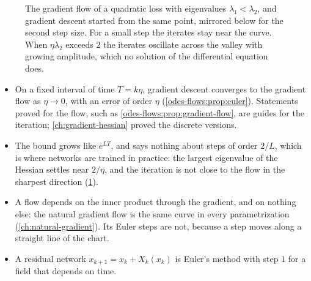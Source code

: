 \begin{notechapter}
\begin{figure}[ht]
\centering
{}
\caption{The gradient flow of a quadratic loss with eigenvalues
$\lambda_1 < \lambda_2$, and gradient descent started from the same
point, mirrored below for the second step size. For a small step the
iterates stay near the curve. When $\eta\lambda_2$ exceeds $2$ the
iterates oscillate across the valley with growing amplitude, which no
solution of the differential equation does.}
\label{odes-flows:fig:euler}
\end{figure}

\begin{mlthread}
\begin{itemize}[nosep]
  \item On a fixed interval of time $T = k\eta$, gradient descent
        converges to the gradient flow as $\eta\to0$, with an error of
        order $\eta$ (\cref{odes-flows:prop:euler}). Statements proved
        for the flow, such as
        \cref{odes-flows:prop:gradient-flow}, are guides for the
        iteration; \cref{ch:gradient-hessian} proved the discrete
        versions.
  \item The bound grows like $e^{LT}$, and says nothing about steps of
        order $2/L$, which is where networks are trained in practice:
        the largest eigenvalue of the Hessian settles near $2/\eta$,
        and the iteration is not close to the flow in the sharpest
        direction (\cref{odes-flows:fig:euler}).
  \item A flow depends on the inner product through the gradient, and
        on nothing else: the natural gradient flow is the same curve
        in every parametrization (\cref{ch:natural-gradient}). Its
        Euler steps are not, because a step moves along a straight
        line of the chart.
  \item A residual network $x_{k+1} = x_k + X_k(x_k)$ is Euler's
        method with step $1$ for a field that depends on time.
\end{itemize}
\end{mlthread}


\end{notechapter}
